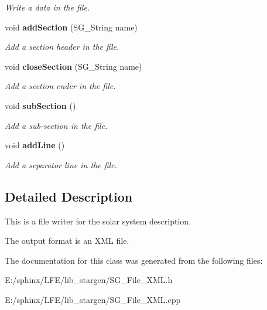 \begin{CompactItemize}
\begin{CompactList}\small\item\em Write a data in the file. \item\end{CompactList}\item 
void {\bf add\-Section} (SG\_\-String name)\label{class_s_g___file___x_m_l_b6}

\begin{CompactList}\small\item\em Add a section header in the file. \item\end{CompactList}\item 
void {\bf close\-Section} (SG\_\-String name)\label{class_s_g___file___x_m_l_b7}

\begin{CompactList}\small\item\em Add a section ender in the file. \item\end{CompactList}\item 
void {\bf sub\-Section} ()\label{class_s_g___file___x_m_l_b8}

\begin{CompactList}\small\item\em Add a sub-section in the file. \item\end{CompactList}\item 
void {\bf add\-Line} ()\label{class_s_g___file___x_m_l_b9}

\begin{CompactList}\small\item\em Add a separator line in the file. \item\end{CompactList}\end{CompactItemize}


\subsection{Detailed Description}
This is a file writer for the solar system description. 

The output format is an XML file. 



The documentation for this class was generated from the following files:\begin{CompactItemize}
\item 
E:/sphinx/LFE/lib\_\-stargen/SG\_\-File\_\-XML.h\item 
E:/sphinx/LFE/lib\_\-stargen/SG\_\-File\_\-XML.cpp\end{CompactItemize}

